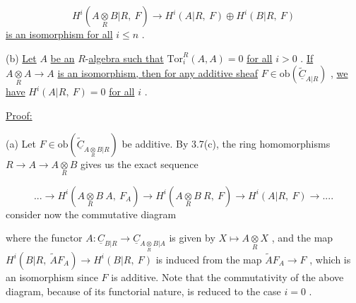 \begin{equation*}
H^{i}(A\underset{R}{\otimes}B|R,\ F) \rightarrow H^{i}(A|R,\ F) \oplus H^{i}(B|R,\ F)
\end{equation*}
\underline{is an isomorphism for all}  $i \leq n$  .

(b)  \underline{Let}  $A$  \underline{be an} $R$-\underline{algebra such that}  $\mathrm{Tor}^{R}_{i}(A, A) = 0$  \underline{for all}  $i > 0$  . \underline{If}  $A\underset{R}{\otimes}A \rightarrow A$  \underline{is an isomorphism, then for any additive sheaf}  $F \in \mathrm{ob}(\widetilde{\underline{C}}_{A|R})$  , \underline{we have}  $H^{i}(A|R,\ F) = 0$  \underline{for all}  $i$  .


\underline{Proof:}

(a)  Let  $F \in \mathrm{ob}(\widetilde{\underline{C}}_{A\underset{R}{\otimes}B|R})$  be additive. By 3.7(c), the ring homomorphisms $R \rightarrow A \rightarrow A\underset{R}{\otimes}B$  gives us the exact sequence

\begin{equation}\tag{*}
... \rightarrow H^{i}(A\underset{R}{\otimes}B\ A,\ F_{A}) \rightarrow H^{i}(A\underset{R}{\otimes}B\ R,\ F) \rightarrow H^{i}(A|R,\ F) \rightarrow ....
\end{equation}
consider now the commutative diagram

\begin{center}
\end{center}
where the functor  $A : \underline{C}_{B|R} \rightarrow \underline{C}_{A\underset{R}{\otimes}B|A}$  is given by  $X \longmapsto A\underset{R}{\otimes}X$  , and the map $H^{i}(B|R,\ \widetilde{A}F_{A}) \rightarrow H^{i}(B|R,\ F)$  is induced from the map  $\widetilde{A}F_{A} \rightarrow F$  , which is an isomorphism since  $F$  is additive.  Note that the commutativity of the above diagram, because of its functorial nature, is reduced to the case  $i = 0$  .

